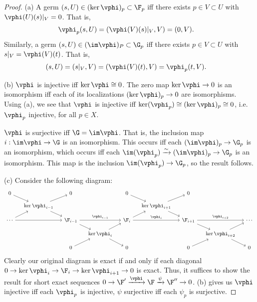 \documentclass[12pt]{amsart}
\begin{document}
\begin{proof}
  (a) A germ $(s,U)\in (\ker\vphi)_p\subset \F_p$ iff there exists $p\in V\subset U$ with $\vphi(U)(s)|_V = 0$. That is, 
  \begin{align*}
    \vphi_p(s,U) &= (\vphi(V)(s)|_V,V)=(0,V).
  \end{align*}
  Similarly, a germ $(s,U)\in (\im\vphi)_P\subset \G_p$ iff there exists $p\in V\subset U$ with $s|_V= \vphi(V)(t)$. That is,
  \begin{align*}
    (s,U) &= (s|_V,V) = (\vphi(V)(t),V) 
    = \vphi_p(t,V).
  \end{align*}

  (b) $\vphi$ is injective iff $\ker\vphi\cong 0$. The zero map $\ker\vphi\to 0$ is an isomorphism iff each of its localizations $(\ker\vphi)_p\to 0$ are isomorphisms. Using (a), we see that $\vphi$ is injective iff $\ker(\vphi_p)\cong (\ker\vphi)_p\cong 0$, i.e. $\vphi_p$ injective, for all $p\in X$.

  $\vphi$ is surjective iff $\G = \im\vphi$. That is, the inclusion map $i:\im\vphi\to \G$ is an isomorphism.
  This occurs iff each $(\im\vphi)_p\to \G_p$ is an isomorphism, which occurs iff each $\im(\vphi_p)\xrightarrow{\sim} (\im\vphi)_p\to \G_p$ is an isomorphism. 
  This map is the inclusion $\im(\vphi_p)\to \G_p$, so the result follows.

  (c) Consider the following diagram:
  \[
    \begin{tikzcd}[column sep=small,row sep=small]%
      0\ar[dr]&&0&&0\ar[dr]&&0 \\
      &\ker\vphi_{i-1}\ar[dr]\ar[ur] &&&&\ker\vphi_{i+1}\ar[dr]\ar[ur]\\
      \cdots\ar[ur]\ar[rr]&&\F_{i-1}\ar[rr,"\vphi_{i-1}"]\ar[dr] && \F_i\ar[rr,"\vphi_i"]\ar[ur] && \F_{i+1}\ar[rr,"\vphi_{i+2}"]\ar[dr] &&\cdots \\
                          &&&\ker\vphi_i\ar[ur]\ar[dr]&&&&\ker\vphi_{i+2}\ar[ur]\ar[dr] \\
                          &&0\ar[ur]&&0&&0\ar[ur]&&0
    \end{tikzcd}
  \] 
  Clearly our original diagram is exact if and only if each diagonal $0\to \ker\vphi_i\to \F_i\to \ker\vphi_{i+1}\to0$ is exact.
  Thus, it suffices to show the result for short exact sequences $0\to \F'\xrightarrow{\vphi}\F\xrightarrow{\psi}\F''\to 0$.
  (b) gives us $\vphi$ injective iff each $\vphi_p$ is injective, $\psi$ surjective iff each $\psi_p$ is surjective. 


\end{proof}
\end{document}
